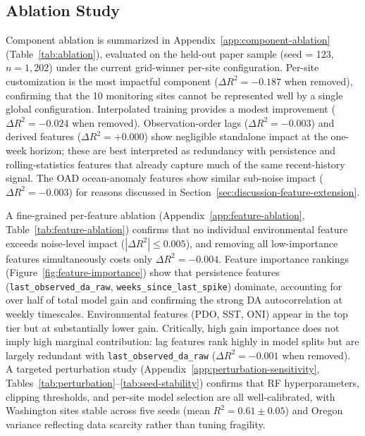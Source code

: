 \documentclass[toxins,article,submit,moreauthors]{Definitions/mdpi}
\begin{document}
\subsection{Ablation Study}
\label{sec:results-ablation}

Component ablation is summarized in Appendix~\ref{app:component-ablation} (Table~\ref{tab:ablation}), evaluated on the held-out paper sample (seed = 123, $n = 1{,}202$) under the current grid-winner per-site configuration. Per-site customization is the most impactful component ($\Delta R^2 = -0.187$ when removed), confirming that the 10 monitoring sites cannot be represented well by a single global configuration. Interpolated training provides a modest improvement ($\Delta R^2 = -0.024$ when removed). Observation-order lags ($\Delta R^2 = -0.003$) and derived features ($\Delta R^2 = +0.000$) show negligible standalone impact at the one-week horizon; these are best interpreted as redundancy with persistence and rolling-statistics features that already capture much of the same recent-history signal. The OAD ocean-anomaly features show similar sub-noise impact ($\Delta R^2 = -0.003$) for reasons discussed in Section~\ref{sec:discussion-feature-extension}.

\begin{sloppypar}
A fine-grained per-feature ablation (Appendix~\ref{app:feature-ablation}, Table~\ref{tab:feature-ablation}) confirms that no individual environmental feature exceeds noise-level impact ($|\Delta R^2| \leq 0.005$), and removing all low-importance features simultaneously costs only $\Delta R^2 = -0.004$. Feature importance rankings (Figure~\ref{fig:feature-importance}) show that persistence features (\texttt{last\_observed\_da\_raw}, \texttt{weeks\_since\_last\_spike}) dominate, accounting for over half of total model gain and confirming the strong DA autocorrelation at weekly timescales. Environmental features (PDO, SST, ONI) appear in the top tier but at substantially lower gain. Critically, high gain importance does not imply high marginal contribution: lag features rank highly in model splits but are largely redundant with \texttt{last\_observed\_da\_raw} ($\Delta R^2 = -0.001$ when removed). A targeted perturbation study (Appendix~\ref{app:perturbation-sensitivity}, Tables~\ref{tab:perturbation}--\ref{tab:seed-stability}) confirms that RF hyperparameters, clipping thresholds, and per-site model selection are all well-calibrated, with Washington sites stable across five seeds (mean $R^2 = 0.61 \pm 0.05$) and Oregon variance reflecting data scarcity rather than tuning fragility.
\end{sloppypar}
\end{document}
